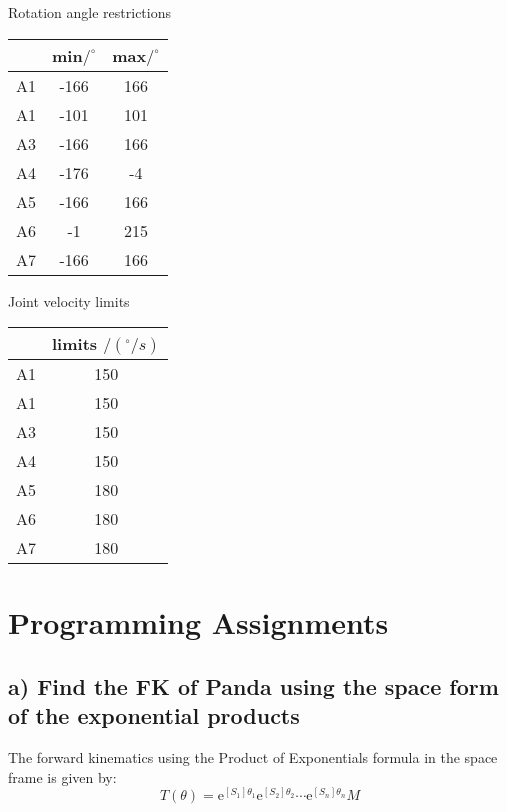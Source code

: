\documentclass[english,10pt,a4paper]{book}
\begin{document}
    Rotation angle restrictions
    \begin{center}
        \begin{tabular}{|c|c|c|}
            \hline
            & min$/^\circ$& max$/^\circ$ \\
            \hline
            A1 & -166 & 166 \\
            \hline
            A1 & -101 & 101 \\
            \hline
            A3 & -166 & 166 \\
            \hline
            A4 & -176 & -4 \\
            \hline
            A5 & -166 & 166 \\
            \hline
            A6 & -1 & 215 \\
            \hline
            A7 & -166 & 166 \\
            \hline
        \end{tabular}
    \end{center}
    
    Joint velocity limits
    \begin{center}
    	\begin{tabular}{|c|c|}
    		\hline
    		& limits $/(^\circ/s)$ \\
    		\hline
    		A1 & 150 \\
    		\hline
    		A1 & 150 \\
    		\hline
    		A3 & 150 \\
    		\hline
    		A4 & 150 \\
    		\hline
    		A5 & 180 \\
    		\hline
    		A6 & 180 \\
    		\hline
    		A7 & 180 \\
    		\hline
    	\end{tabular}
    \end{center}
    
    \section{Programming Assignments}
    \subsection*{a) Find the FK of Panda using the space form of the exponential products}
	The forward kinematics using the Product of Exponentials formula in the space frame is given by:
	\begin{equation}
		T(\theta) = \mathrm{e}^{[S_1]\theta_1} \mathrm{e}^{[S_2]\theta_2} \cdots \mathrm{e}^{[S_n]\theta_n} M
	\end{equation}
	
\end{document}
